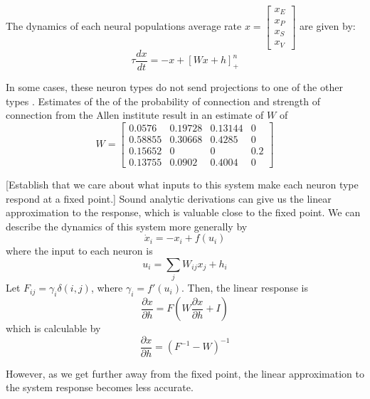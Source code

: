 \documentclass[11pt]{article}
\begin{document}
The dynamics of each neural populations average rate
$x = \begin{bmatrix} x_E \\ x_P \\ x_S \\ x_V \end{bmatrix}$
are given by:
\begin{equation}
\tau \frac{dx}{dt} = -x + [W x+ h]_+^n
\end{equation}

In some cases, these neuron types do not send projections to one of the other types \cite{pfeffer2013inhibition}.  Estimates of the of the probability of connection and strength of connection from the Allen institute result in an estimate of $W$ of 
\begin{equation}
W = \begin{bmatrix} 0.0576 &  0.19728 & 0.13144 & 0 \\
                                0.58855 & 0.30668 & 0.4285 & 0 \\
                                0.15652 & 0 & 0 & 0.2 \\
                                0.13755 & 0.0902 &  0.4004 &  0 \end{bmatrix}
\end{equation}

[Establish that we care about what inputs to this system make each neuron type respond at a fixed point.]  Sound analytic derivations can give us the linear approximation to the response, which is valuable close to the fixed point.  We can describe the dynamics of this system more generally by
\begin{equation}
\dot{x}_i = -x_i + f(u_i)
\end{equation}
where the input to each neuron is
\begin{equation}
u_i = \sum_j W_{ij} x_j + h_i
\end{equation}
Let $F_{ij} = \gamma_i \delta(i,j)$, where $\gamma_i = f'(u_i)$.  Then, the linear response is
\begin{equation}
\frac{\partial x}{\partial h} = F(W\frac{\partial x}{\partial h} + I)
\end{equation}
which is calculable by
\begin{equation}
\frac{\partial x}{\partial h} = (F^{-1} - W)^{-1}
\end{equation}

However, as we get further away from the fixed point, the linear approximation to the system response becomes less accurate.
\end{document}
